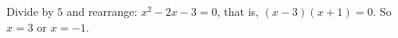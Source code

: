 Divide by $5$ and rearrange: $x^2-2x-3=0$, that is, $(x-3)(x+1)=0$. So $x=\boxed{3}$ or $x=\boxed{-1}$.
